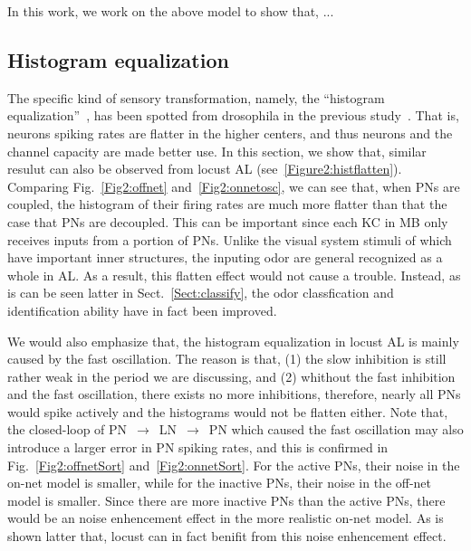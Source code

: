 \documentclass[12pt, a4paper]{article}
\begin{document}
In this work, we work on the above model to show that, ...


\subsection{Histogram equalization} \label{Sect:histeq}
The specific kind of sensory transformation, namely, the ``histogram equalization''~\citep{}, has been spotted from drosophila in the previous study~\citep{}. That is, neurons spiking rates are flatter in the higher centers, and thus neurons and the channel capacity are made better use. In this section, we show that, similar resulut can also be observed from locust AL (see~\ref{Figure2:histflatten}). Comparing Fig.~\ref{Fig2:offnet} and~\ref{Fig2:onnetosc}, we can see that, when PNs are coupled, the histogram of their firing rates are much more flatter than that the case that PNs are decoupled. This can be important since each KC in MB only receives inputs from a portion of PNs. Unlike the visual system stimuli of which have important inner structures, the inputing odor are general recognized as a whole in AL. As a result, this flatten effect would not cause a trouble. Instead, as is can be seen latter in Sect.~\ref{Sect:classify}, the odor classfication and identification ability have in fact been improved.

We would also emphasize that, the histogram equalization in locust AL is mainly caused by the fast oscillation. The reason is that, (1) the slow inhibition is still rather weak in the period we are discussing, and (2) whithout the fast inhibition and the fast oscillation, there exists no more inhibitions, therefore, nearly all PNs would spike actively and the histograms would not be flatten either. Note that, the closed-loop of {PN~$\rightarrow$~LN~$\rightarrow$~PN} which caused the fast oscillation may also introduce a larger error in PN spiking rates, and this is confirmed in Fig.~\ref{Fig2:offnetSort} and~\ref{Fig2:onnetSort}. For the active PNs, their noise in the on-net model is smaller, while for the inactive PNs, their noise in the off-net model is smaller. Since there are more inactive PNs than the active PNs, there would be an noise enhencement effect in the more realistic on-net model. As is shown latter that, locust can in fact benifit from this noise enhencement effect.
\end{document}
